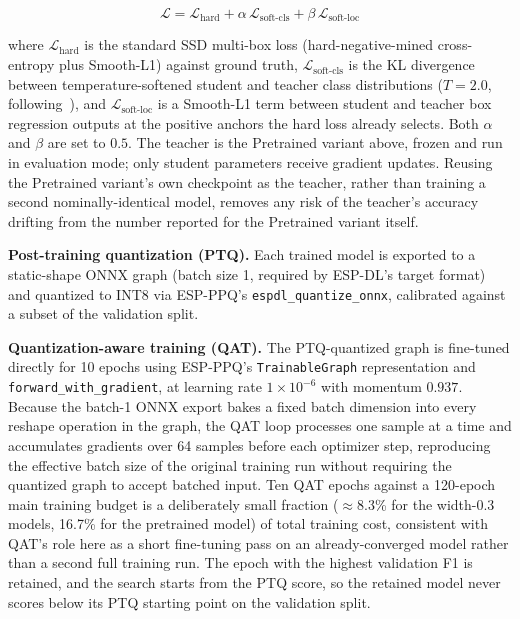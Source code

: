 \documentclass[conference]{IEEEtran}
\begin{document}
	\begin{equation}
		\mathcal{L} = \mathcal{L}_{\text{hard}} + \alpha\, \mathcal{L}_{\text{soft-cls}} +
		\beta\, \mathcal{L}_{\text{soft-loc}}
		\label{eq:kdloss}
	\end{equation}
	
	where $\mathcal{L}_{\text{hard}}$ is the standard SSD multi-box loss (hard-negative-mined
	cross-entropy plus Smooth-L1) against ground truth, $\mathcal{L}_{\text{soft-cls}}$ is the KL
	divergence between temperature-softened student and teacher class distributions
	($T=2.0$, following~\cite{hinton2015distilling}), and $\mathcal{L}_{\text{soft-loc}}$ is a
	Smooth-L1 term between student and teacher box regression outputs at the positive anchors the
	hard loss already selects. Both $\alpha$ and $\beta$ are set to $0.5$. The teacher is the
	Pretrained variant above, frozen and run in evaluation mode; only student parameters receive
	gradient updates. Reusing the Pretrained variant's own checkpoint as the teacher, rather than
	training a second nominally-identical model, removes any risk of the teacher's accuracy
	drifting from the number reported for the Pretrained variant itself.
	
	\textbf{Post-training quantization (PTQ).} Each trained model is exported to a static-shape
	ONNX graph (batch size 1, required by ESP-DL's target format) and quantized to INT8 via
	ESP-PPQ's \texttt{espdl\_quantize\_onnx}, calibrated against a subset of the validation split.
	
	\textbf{Quantization-aware training (QAT).} The PTQ-quantized graph is fine-tuned directly for
	10 epochs using ESP-PPQ's \texttt{TrainableGraph} representation and
	\texttt{forward\_with\_gradient}, at learning rate $1\times10^{-6}$ with momentum $0.937$.
	Because the batch-1 ONNX export bakes a fixed batch dimension into every reshape operation in
	the graph, the QAT loop processes one sample at a time and accumulates gradients over 64
	samples before each optimizer step, reproducing the effective batch size of the original
	training run without requiring the quantized graph to accept batched input. Ten QAT epochs
	against a 120-epoch main training budget is a deliberately small fraction ($\approx$8.3\% for the width-0.3 models, 16.7\% for the pretrained model) of
	total training cost, consistent with QAT's role here as a short
	fine-tuning pass on an already-converged model rather than a second full training run. The epoch with the highest validation F1 is retained, and the search starts from the PTQ score, so the retained model never scores below its PTQ starting point on the validation split.
	
\end{document}
